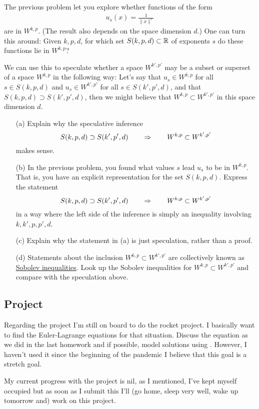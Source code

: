 \documentclass[12pt]{memoir}
\begin{document}
\begin{Ej}
    The previous problem let you explore whether functions of the form
  \begin{align*}
    u_s(x) = \frac{1}{\|x\|^s}
  \end{align*}
  are in $W^{k,p}$. (The result also depends on the space dimension
  $d$.) One can turn this around: Given $k,p,d$, for which set
  $S(k,p,d)\subset \mathbb{R}$ of exponents $s$ do these functions lie in $W^{k,p}$?

  We can use this to speculate whether a space $W^{k',p'}$ may be a
  subset or superset of a space $W^{k,p}$ in the following way: Let's
  say that $u_s \in W^{k,p}$ for all $s\in S(k,p,d)$ and 
  $u_s \in W^{k',p'}$ for all $s\in S(k',p',d)$, and that 
  $S(k,p,d) \supset S(k',p',d)$, then we might believe that 
  $W^{k,p} \subset W^{k',p'}$ in this space dimension $d$.

  \begin{itemize}
  \item[(a)] Explain why the speculative inference
  $$
    S(k,p,d) \supset S(k',p',d)
    \qquad\Rightarrow\qquad
    W^{k,p} \subset W^{k',p'}
  $$
  makes sense.

  \item[(b)] In the previous problem, you found what values $s$ lead
    $u_s$ to be in $W^{k,p}$. That is, you have an explicit
    representation for the set $S(k,p,d)$. Express the statement
    $$
    S(k,p,d) \supset S(k',p',d)
    \qquad\Rightarrow\qquad
    W^{k,p} \subset W^{k',p'}
  $$
  in a way where the left side of the inference is simply an
  inequality involving $k,k',p,p',d$.

  \item[(c)] Explain why the statement in (a) is just speculation, rather than a
    proof.

  \item[(d)] Statements about the inclusion $W^{k,p} \subset
    W^{k',p'}$ are collectively known as
    \href{https://en.wikipedia.org/wiki/Sobolev_inequality}{Sobolev
      inequalities}. Look up the Sobolev inequalities for $W^{k,p} \subset
    W^{k',p'}$ and compare with the speculation above. 
  \end{itemize}
\end{Ej}


\subsection*{Project}

Regarding the project I'm still on board to do the rocket project. I basically want to find the Euler-Lagrange equations for that situation. Discuss the equation as we did in the last homework and if possible, model solutions using . However, I haven't used it since the beginning of the pandemic I believe that this goal is a stretch goal.\par 
My current progress with the project is nil, as I mentioned, I've kept myself occupied but as soon as I submit this I'll (go home, sleep very well, wake up tomorrow and) work on this project.
\end{document}
